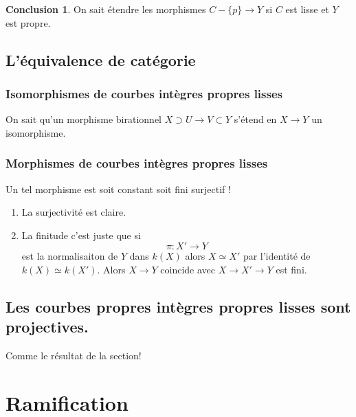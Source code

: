\documentclass[a4paper,12pt]{book}
\theoremstyle{plain}
\theoremstyle{definition}
\newtheorem{concl}{Conclusion}
\theoremstyle{remark}
\begin{document}
\begin{concl}
  On sait étendre les morphismes $C-\{p\} \to Y$ 
  si $C$ est lisse et $Y$ est propre.
\end{concl}
\section{L'équivalence de catégorie}
\subsection{Isomorphismes de courbes intègres propres lisses}
On sait qu'un morphisme birationnel $X\supset U\to V\subset Y$
s'étend en $X\to Y$ un isomorphisme.

\subsection{Morphismes de courbes intègres propres lisses}
Un tel morphisme est soit constant soit fini surjectif ! 
\begin{enumerate}
  \item La surjectivité est claire.
  \item La finitude c'est juste que si
    \[\pi \colon X'\to Y\]
    est la normalisaiton de $Y$ dans $k(X)$ alors
    $X\simeq X'$ par l'identité de $k(X)\simeq k(X')$.
    Alors $X\to Y$ coincide avec $X\to X'\to Y$ est fini.
\end{enumerate}

\section{Les courbes propres intègres propres lisses sont projectives.}
Comme le résultat de la section!

\chapter{Ramification}
\section{}




\printbibliography
\end{document}
